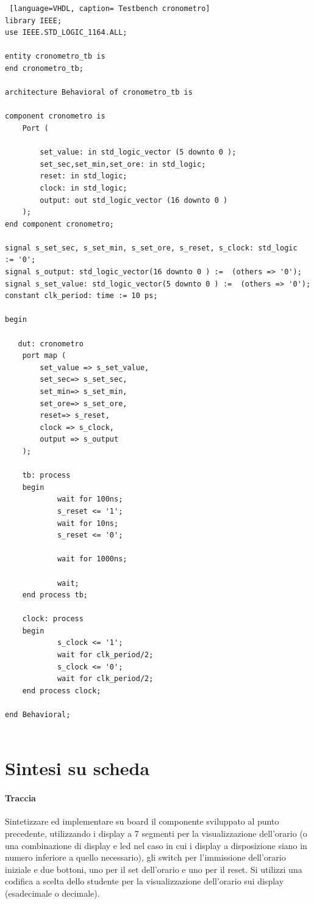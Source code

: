 \begin{lstlisting} [language=VHDL, caption= Testbench cronometro]
library IEEE;
use IEEE.STD_LOGIC_1164.ALL;

entity cronometro_tb is
end cronometro_tb;

architecture Behavioral of cronometro_tb is

component cronometro is
    Port (

        set_value: in std_logic_vector (5 downto 0 );
        set_sec,set_min,set_ore: in std_logic;
        reset: in std_logic;
        clock: in std_logic;
        output: out std_logic_vector (16 downto 0 )
    );
end component cronometro;

signal s_set_sec, s_set_min, s_set_ore, s_reset, s_clock: std_logic  := '0';
signal s_output: std_logic_vector(16 downto 0 ) :=  (others => '0');
signal s_set_value: std_logic_vector(5 downto 0 ) :=  (others => '0');
constant clk_period: time := 10 ps;

begin

   dut: cronometro
    port map (
        set_value => s_set_value,
        set_sec=> s_set_sec,
        set_min=> s_set_min,
        set_ore=> s_set_ore,
        reset=> s_reset,
        clock => s_clock,
        output => s_output
    );  
      
    tb: process
    begin
            wait for 100ns;
            s_reset <= '1';
            wait for 10ns;
            s_reset <= '0';
            
            wait for 1000ns;
            
            wait;
    end process tb;
    
    clock: process
    begin
            s_clock <= '1';
            wait for clk_period/2;
            s_clock <= '0';
            wait for clk_period/2;
    end process clock;

end Behavioral;


\end{lstlisting}

\section{Sintesi su scheda}
\paragraph{Traccia} Sintetizzare ed implementare su board il componente sviluppato al punto precedente, utilizzando i display a 7 segmenti per la visualizzazione dell’orario (o una combinazione di display e led nel caso in cui i display a disposizione siano in numero inferiore a quello necessario), gli switch per l’immissione dell’orario iniziale e due bottoni, uno per il set dell’orario e uno per il reset. Si utilizzi una codifica a scelta dello studente per la visualizzazione dell’orario sui display (esadecimale o decimale).


